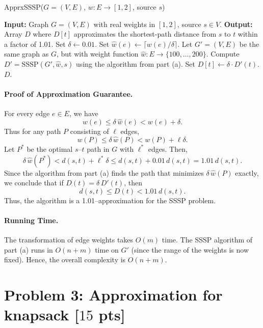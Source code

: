 \documentclass[letterpaper, 11pt]{article}
\newcommand{\1}{\mathds{1}}	%
\theoremstyle{definition}
\newcommand{\problem}[1]{\section*{Problem #1}}
\newenvironment{solution}{{\par\noindent\it Solution.}}{}
\begin{document}
\begin{solution}
\begin{algorithm}
\caption{ApprxSSSP($G=(V,E)$, $w: E\to [1,2]$, source $s$)}
\begin{algorithmic}[1]
\State \textbf{Input:} Graph $G=(V,E)$ with real weights in $[1,2]$, source $s\in V$.
\State \textbf{Output:} Array $D$ where $D[t]$ approximates the shortest-path distance from $s$ to $t$ within a factor of 1.01.
\medskip
\State Set $\delta \gets 0.01$.
    \State Set $\hat{w}(e) \gets \lceil w(e)/\delta \rceil$.
\EndFor
\medskip
\State Let $G'=(V,E)$ be the same graph as $G$, but with weight function $\hat{w} : E\to \{100,\ldots,200\}$.
\medskip
\State Compute $D' = \text{SSSP}(G', \hat{w}, s)$ using the algorithm from part (a).
\medskip
{}
    \State Set $D[t] \gets \delta \cdot D'(t)$.
\EndFor
\State \Return $D$.
\end{algorithmic}
\end{algorithm}

\paragraph{Proof of Approximation Guarantee.}  
For every edge $e\in E$, we have
\[
w(e) \le \delta \, \hat{w}(e) < w(e)+\delta.
\]
Thus for any path $P$ consisting of $\ell$ edges,
\[
w(P) \le \delta\, \hat{w}(P) < w(P) + \ell \delta.
\]
Let $P^*$ be the optimal $s$--$t$ path in $G$ with $\ell^*$ edges. Then,
\[
\delta\, \hat{w}(P^*) < d(s,t) + \ell^* \delta \le d(s,t) + 0.01\, d(s,t) = 1.01\, d(s,t).
\]
Since the algorithm from part (a) finds the path that minimizes $\delta\, \hat{w}(P)$ exactly, we conclude that if $D(t)=\delta\, D'(t)$, then
\[
d(s,t) \le D(t) < 1.01\, d(s,t).
\]
Thus, the algorithm is a 1.01--approximation for the SSSP problem.

\paragraph{Running Time.}  
The transformation of edge weights takes $O(m)$ time. The SSSP algorithm of part (a) runs in $O(n+m)$ time on $G'$ (since the range of the weights is now fixed). Hence, the overall complexity is $O(n+m)$.
\end{solution}
\clearpage


\problem{3: Approximation for knapsack [$15$ pts]}
\end{document}

